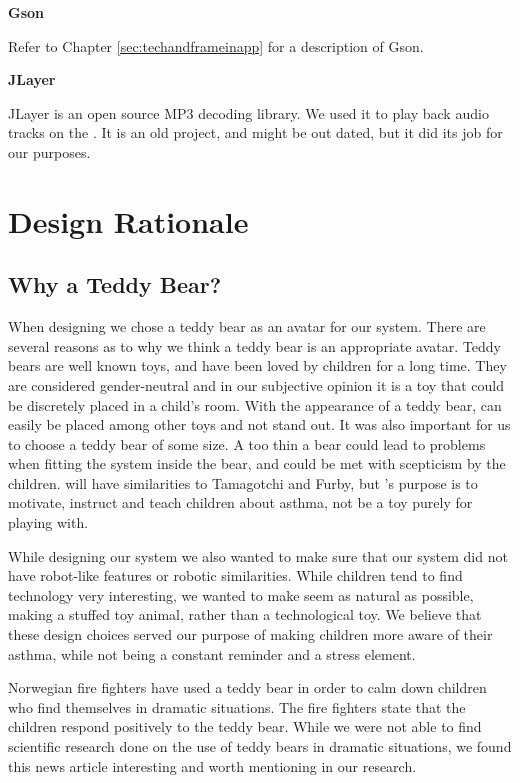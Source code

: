 \textbf{Gson}

Refer to Chapter \ref{sec:techandframeinapp} for a description of Gson.    

\textbf{JLayer}

JLayer  is an open source MP3 decoding library. We used it to play back audio tracks on the \rpi{}. It is an old project, and might be out dated, but it did its job for our purposes.  
 

\section{Design Rationale}
\label{sec:designrationale}
\subsection{Why a Teddy Bear?}
When designing \buddy{} we chose a teddy bear as an avatar for our system. There are several reasons as to why we think a teddy bear is an appropriate avatar. Teddy bears are well known toys, and have been loved by children for a long time. They are considered gender-neutral\cite{stagnitti1997determining}\cite{cherney2006gender} and in our subjective opinion it is a toy that could be discretely placed in a child's room. With the appearance of a teddy bear, \buddy{} can easily be placed among other toys and not stand out. It was also important for us to choose a teddy bear of some size. A too thin a bear could lead to problems when fitting the system inside the bear, and could be met with scepticism by the children. \buddy{} will have similarities to Tamagotchi\cite{tamagotchi} and Furby\cite{furby}, but \buddy{}'s purpose is to motivate, instruct and teach children about asthma, not be a toy purely for playing with. 

While designing our system we also wanted to make sure that our system did not have robot-like features or robotic similarities. While children tend to find technology very interesting, we wanted to make \buddy{} seem as natural as possible, making a stuffed toy animal, rather than a technological toy. We believe that these design choices served our purpose of making children more aware of their asthma, while not being a constant reminder and a stress element. 

Norwegian fire fighters have used a teddy bear in order to calm down children who find themselves in dramatic situations. The fire fighters state that the children respond positively to the teddy bear. 
While we were not able to find scientific research done on the use of teddy bears in dramatic situations, we found this news article interesting and worth mentioning in our research. 

